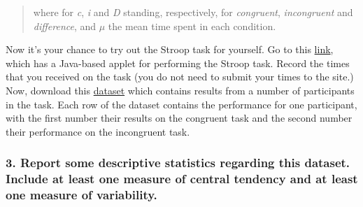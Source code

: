\documentclass[]{article}
\begin{document}
\begin{quote}
where for \emph{c}, \emph{i} and \emph{D} standing, respectively, for
\emph{congruent}, \emph{incongruent} and \emph{difference}, and \(\mu\)
the mean time spent in each condition.
\end{quote}

Now it's your chance to try out the Stroop task for yourself. Go to this
\href{https://faculty.washington.edu/chudler/java/ready.html}{link},
which has a Java-based applet for performing the Stroop task. Record the
times that you received on the task (you do not need to submit your
times to the site.) Now, download this
\href{https://drive.google.com/file/d/0B9Yf01UaIbUgQXpYb2NhZ29yX1U/view?usp=sharing}{dataset}
which contains results from a number of participants in the task. Each
row of the dataset contains the performance for one participant, with
the first number their results on the congruent task and the second
number their performance on the incongruent task.

\subsubsection{3. Report some descriptive statistics regarding this
dataset. Include at least one measure of central tendency and at least
one measure of
variability.}\label{report-some-descriptive-statistics-regarding-this-dataset.-include-at-least-one-measure-of-central-tendency-and-at-least-one-measure-of-variability.}
\end{document}
